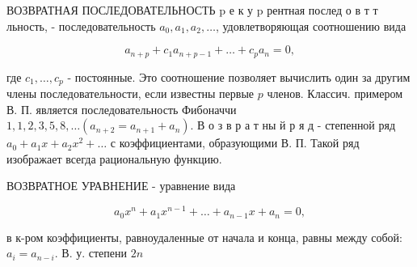 \documentclass[10pt]{article}
\begin{document}
ВОЗВРАТНАЯ ПОСЛЕДОВАТЕЛЬНОСТЬ $\mathrm{p}$ е к у $\mathrm{p}$ рентная послед о в т т льность, - последовательность $a_{0}, a_{1}, a_{2}, \ldots$, удовлетворяющая соотношению вида



\[

a_{n+p}+c_{1} a_{n+p-1}+\ldots+c_{p} a_{n}=0,

\]



где $c_{1}, \ldots, c_{p}$ - постоянные. Это соотношение позволяет вычислить один за другим члены последовательности, если известны первые $p$ членов. Классич. примером В. П. является последовательность Фибоначчи $1,1,2,3,5,8, \ldots\left(a_{n+2}=a_{n+1}+a_{n}\right)$. В о з в р а т ны й р я д - степенной ряд $a_{0}+a_{1} x+a_{2} x^{2}+\ldots$ с коэффициентами, образующими В. П. Такой ряд изображает всегда рациональную функцию.



ВОЗВРАТНОЕ УРАВНЕНИЕ - уравнение вида



\[

a_{0} x^{n}+a_{1} x^{n-1}+\ldots+a_{n-1} x+a_{n}=0,

\]



в к-ром коэффициенты, равноудаленные от начала и конца, равны между собой: $a_{i}=a_{n-i}$. В. у. степени $2 n$
\end{document}
